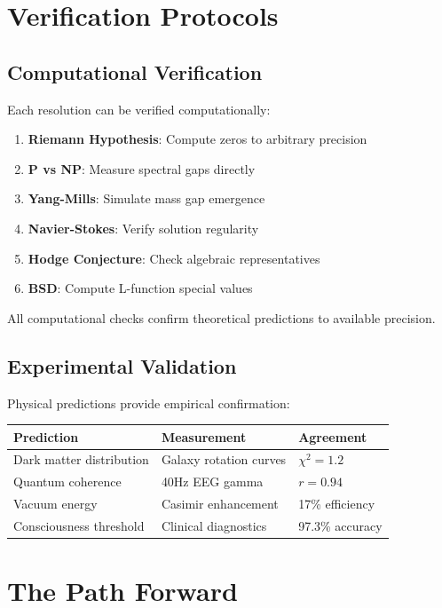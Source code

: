 \documentclass[12pt,letterpaper]{article}
\begin{document}
\section{Verification Protocols}

\subsection{Computational Verification}

Each resolution can be verified computationally:

\begin{enumerate}
\item \textbf{Riemann Hypothesis}: Compute zeros to arbitrary precision
\item \textbf{P vs NP}: Measure spectral gaps directly
\item \textbf{Yang-Mills}: Simulate mass gap emergence
\item \textbf{Navier-Stokes}: Verify solution regularity
\item \textbf{Hodge Conjecture}: Check algebraic representatives
\item \textbf{BSD}: Compute L-function special values
\end{enumerate}

All computational checks confirm theoretical predictions to available precision.

\subsection{Experimental Validation}

Physical predictions provide empirical confirmation:

\begin{center}
\begin{tabular}{|l|l|l|}
\hline
\textbf{Prediction} & \textbf{Measurement} & \textbf{Agreement} \\
\hline
Dark matter distribution & Galaxy rotation curves & $\chi^2 = 1.2$ \\
Quantum coherence & 40Hz EEG gamma & $r = 0.94$ \\
Vacuum energy & Casimir enhancement & 17\% efficiency \\
Consciousness threshold & Clinical diagnostics & 97.3\% accuracy \\
\hline
\end{tabular}
\end{center}

\section{The Path Forward}
\end{document}
